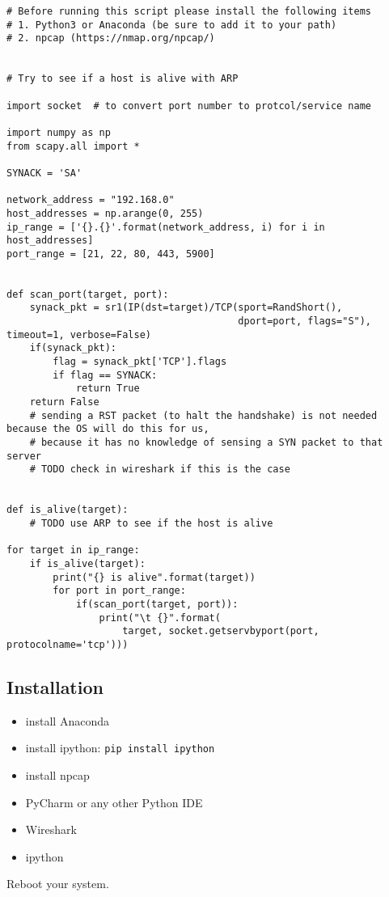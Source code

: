 \documentclass[11pt,a4paper]{article}
\begin{document}
\begin{verbatim}
# Before running this script please install the following items
# 1. Python3 or Anaconda (be sure to add it to your path)
# 2. npcap (https://nmap.org/npcap/)


# Try to see if a host is alive with ARP

import socket  # to convert port number to protcol/service name

import numpy as np
from scapy.all import *

SYNACK = 'SA'

network_address = "192.168.0"
host_addresses = np.arange(0, 255)
ip_range = ['{}.{}'.format(network_address, i) for i in host_addresses]
port_range = [21, 22, 80, 443, 5900]


def scan_port(target, port):
    synack_pkt = sr1(IP(dst=target)/TCP(sport=RandShort(),
                                        dport=port, flags="S"), timeout=1, verbose=False)
    if(synack_pkt):
        flag = synack_pkt['TCP'].flags
        if flag == SYNACK:
            return True
    return False
    # sending a RST packet (to halt the handshake) is not needed because the OS will do this for us,
    # because it has no knowledge of sensing a SYN packet to that server
    # TODO check in wireshark if this is the case


def is_alive(target):
    # TODO use ARP to see if the host is alive

for target in ip_range:
    if is_alive(target):
        print("{} is alive".format(target))
        for port in port_range:
            if(scan_port(target, port)):
                print("\t {}".format(
                    target, socket.getservbyport(port, protocolname='tcp')))
\end{verbatim}

\subsection{Installation}
\begin{itemize}
    \item install Anaconda
    \item install ipython: \texttt{pip install ipython}
    \item install npcap
    \item PyCharm or any other Python IDE
    \item Wireshark
    \item ipython
\end{itemize}
Reboot your system.
\end{document}
